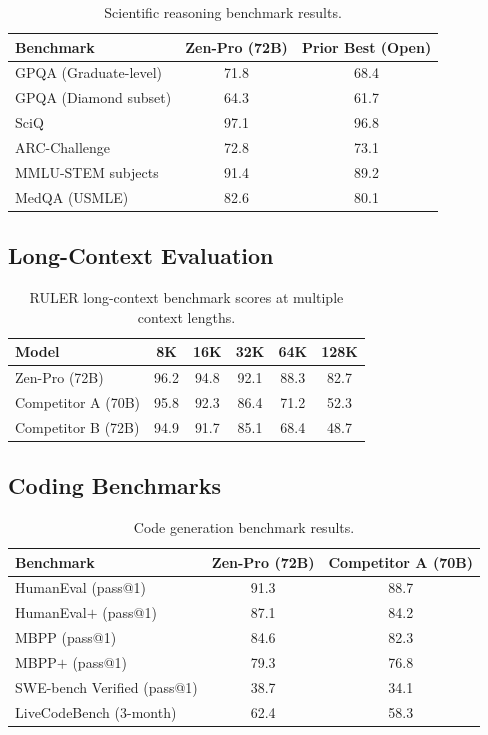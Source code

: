 \documentclass[11pt,a4paper]{article}
\begin{document}
\begin{table}[H]
\centering
\caption{Scientific reasoning benchmark results.}
\label{tab:science}
\begin{tabular}{lcc}
\toprule
\textbf{Benchmark} & \textbf{Zen-Pro (72B)} & \textbf{Prior Best (Open)} \\
\midrule
GPQA (Graduate-level)    & 71.8 & 68.4 \\
GPQA (Diamond subset)    & 64.3 & 61.7 \\
SciQ                     & 97.1 & 96.8 \\
ARC-Challenge            & 72.8 & 73.1 \\
MMLU-STEM subjects       & 91.4 & 89.2 \\
MedQA (USMLE)            & 82.6 & 80.1 \\
\bottomrule
\end{tabular}
\end{table}

\subsection{Long-Context Evaluation}

\begin{table}[H]
\centering
\caption{RULER long-context benchmark scores at multiple context lengths.}
\label{tab:longctx}
\begin{tabular}{lccccc}
\toprule
\textbf{Model} & \textbf{8K} & \textbf{16K} & \textbf{32K} & \textbf{64K} & \textbf{128K} \\
\midrule
Zen-Pro (72B)      & 96.2 & 94.8 & 92.1 & 88.3 & 82.7 \\
Competitor A (70B) & 95.8 & 92.3 & 86.4 & 71.2 & 52.3 \\
Competitor B (72B) & 94.9 & 91.7 & 85.1 & 68.4 & 48.7 \\
\bottomrule
\end{tabular}
\end{table}

\subsection{Coding Benchmarks}

\begin{table}[H]
\centering
\caption{Code generation benchmark results.}
\label{tab:code}
\begin{tabular}{lcc}
\toprule
\textbf{Benchmark} & \textbf{Zen-Pro (72B)} & \textbf{Competitor A (70B)} \\
\midrule
HumanEval (pass@1)         & 91.3 & 88.7 \\
HumanEval$+$ (pass@1)      & 87.1 & 84.2 \\
MBPP (pass@1)              & 84.6 & 82.3 \\
MBPP$+$ (pass@1)           & 79.3 & 76.8 \\
SWE-bench Verified (pass@1)& 38.7 & 34.1 \\
LiveCodeBench (3-month)    & 62.4 & 58.3 \\
\bottomrule
\end{tabular}
\end{table}
\end{document}
